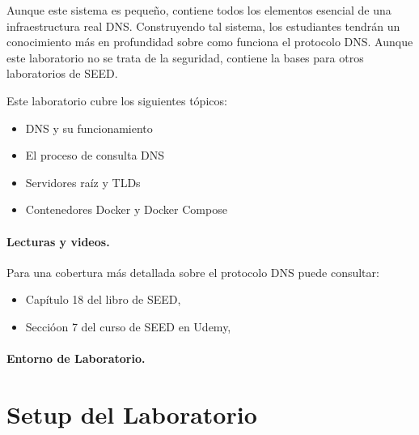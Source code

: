 Aunque este sistema es pequeño, contiene todos los elementos esencial de una infraestructura real DNS. Construyendo tal sistema, los estudiantes tendrán un conocimiento más en profundidad sobre como funciona el protocolo DNS.
Aunque este laboratorio no se trata de la seguridad, contiene la bases para otros laboratorios de SEED.

Este laboratorio cubre los siguientes tópicos:

\begin{itemize}[noitemsep]
\item DNS y su funcionamiento
\item El proceso de consulta DNS
\item Servidores raíz y TLDs
\item Contenedores Docker y Docker Compose
\end{itemize}



\paragraph{Lecturas y videos.}
Para una cobertura más detallada sobre el protocolo DNS puede consultar:

\begin{itemize}
\item Capítulo 18 del libro de SEED, \seedbook
\item Seccióon 7 del curso de SEED en Udemy, \seedisvideo
\end{itemize}


\paragraph{Entorno de Laboratorio.} 
\seedenvironmentB
\nodependency





\section{Setup del Laboratorio} 



